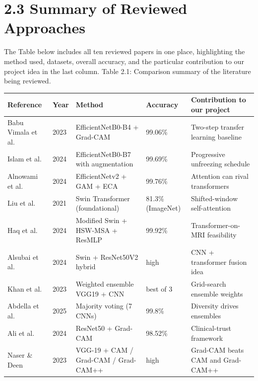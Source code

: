 \documentclass[12pt,a4paper,oneside]{report}
\begin{document}
\section{2.3 Summary of Reviewed Approaches}
The Table below includes all ten reviewed papers in one place, highlighting the method used, datasets, overall accuracy, and the particular contribution to our project idea in the last column.
Table 2.1: Comparison summary of the literature being reviewed.
\begin{center}
\footnotesize
\begin{tabularx}{\textwidth}{YYYYY}
\toprule
\textbf{Reference} & \textbf{Year} & \textbf{Method} & \textbf{Accuracy} & \textbf{Contribution to our project} \\
\midrule
Babu Vimala et al. & 2023 & EfficientNetB0-B4 + Grad-CAM & 99.06\% & Two-step transfer learning baseline \\
Islam et al. & 2024 & EfficientNetB0-B7 with augmentation & 99.69\% & Progressive unfreezing schedule \\
Alnowami et al. & 2024 & EfficientNetv2 + GAM + ECA & 99.76\% & Attention can rival transformers \\
Liu et al. & 2021 & Swin Transformer (foundational) & 81.3\% (ImageNet) & Shifted-window self-attention \\
Haq et al. & 2024 & Modified Swin + HSW-MSA + ResMLP & 99.92\% & Transformer-on-MRI feasibility \\
Alsubai et al. & 2024 & Swin + ResNet50V2 hybrid & high & CNN + transformer fusion idea \\
Khan et al. & 2023 & Weighted ensemble VGG19 + CNN & best of 3 & Grid-search ensemble weights \\
Abdella et al. & 2025 & Majority voting (7 CNNs) & 99.8\% & Diversity drives ensembles \\
Ali et al. & 2024 & ResNet50 + Grad-CAM & 98.52\% & Clinical-trust framework \\
Naser \& Deen & 2023 & VGG-19 + CAM / Grad-CAM / Grad-CAM++ & high & Grad-CAM beats CAM and Grad-CAM++ \\
\bottomrule
\end{tabularx}
\end{center}
\end{document}

